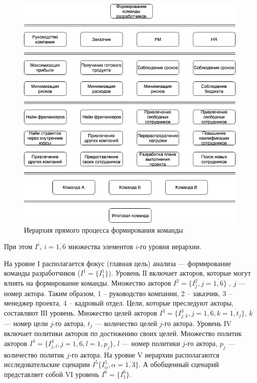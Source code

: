 \begin{figure}[H]
  \centering
    \includegraphics[width=\textwidth]{process}
  \caption{Иерархия прямого процесса формирования команды}
  \label{fig:process}
\end{figure}

При этом $I^i$, $i=\overline{1,6}$ множества элементов $i$-го уровня иерархии. 

На уровне I располагается фокус (главная цель) анализа --- формирование команды разработчиков ($I^1=\{I_1^1\}$). 
Уровень ІІ включает акторов, которые могут влиять на формирование команды. Множество акторов $I^2=\{I^2_j,j=\overline{1,6}\}$ , $j$ --- номер актора. Таким образом, 1 – руководство компании, 2 – заказчик, 3 – менеджер проекта, 4 – кадровый отдел. 
Цели, которые преследуют акторы, составляют ІІІ уровень. Множество целей акторов $I^3=\{I^3_{j,k},j=\overline{1,6},k=\overline{1,t_j}\}$, $k$ --- номер цели $j$-го актора, $t_j$ --- количество целей $j$-го актора. 
Уровень IV включает политики акторов по достижению своих целей. Множество политик акторов $I^4=\{I^4_{j,l},j=\overline{1,6},l=\overline{1,p_j}\}$, $l$ --- номер политики $j$-го актора, $p_j$ --- количество политик $j$-го  актора. 
На уровне V иерархии располагаются исследовательские сценарии $I^5\{I^5_\alpha,\alpha=\overline{1,3}\}$. 
А обобщенный сценарий представляет собой VI уровень $I^6=\{I_1^6\}$.

